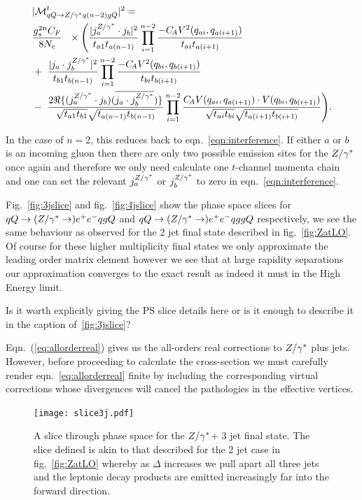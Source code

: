 		\begin{align}
		\begin{split}
		    &|\mathcal{M}^{t}_{qQ\to Z/\gamma^* q(n-2)gQ}|^2 = \\&\frac{g_s^{2n}C_F}{8N_c}\
		    \ \times \Bigg( \frac{| j_a^{Z/\gamma^*}\cdot j_b|^2}{t_{a1}t_{a(n-1)}} \prod^{n-2}_{i=1} \frac{-C_{\!A} V^2(q_{ai},
		      q_{a(i+1)})}{t_{ai} t_{a(i+1)}}  \\ & + \ \frac{|j_a \cdot j_b^{Z/\gamma^*} |^2}{t_{b1}t_{b(n-1)}}
		    \prod^{n-2}_{i=1}\frac{-C_{\!A} V^2(q_{bi}, q_{b(i+1)})}{t_{bi} t_{b(i+1)}}  \\
		    &-\ \frac{2\Re\{(j_a^{Z/\gamma^*}\cdot j_b)(\overline{j_a \cdot
		        j_b^{Z/\gamma^*}})\}}{\sqrt{t_{a1}t_{b1}}\sqrt{t_{a(n-1)} t_{b(n-1)}}}
		    \prod^{n-2}_{i=1}\frac{C_{\!A} V(q_{ai}, q_{a(i+1)})\cdot V(q_{bi},
		      q_{b(i+1)})}{\sqrt{t_{ai}t_{bi}} \sqrt{t_{a(i+1)}t_{b(i+1)}}}\Bigg).
			\label{eq:allorderreal}
		\end{split}
		\end{align}

		In the case of $n=2$, this reduces back to eqn.~\eqref{eqn:interference}.  If
		either $a$ or $b$ is an incoming gluon then there are only two possible emission sites
		for the $Z/\gamma^*$ once again and therefore we only need calculate one $t$-channel momenta chain
		and one can set the relevant $j_a^{Z/\gamma^*}$ or $j_b^{Z/\gamma^*}$ to
		zero in eqn.~\eqref{eqn:interference}.

		Fig.~\eqref{fig:3jslice} and fig.~\eqref{fig:4jslice} show the phase space
		slices for $qQ\to(Z/\gamma^*\to)e^+e^-qgQ$ and $qQ\to(Z/\gamma^*\to)e^+e^-qggQ$
		respectively, we see the same behaviour as observed for the 2 jet final state described in
		fig.~\eqref{fig:ZatLO}.  Of course for these higher multiplicity final states we only
		approximate the leading order matrix element however we see that at large rapidity separations
		our approximation converges to the exact result as indeed it must in the High Energy limit.

		{\color{red}Is it worth explicitly giving the PS slice details here or is it enough
		to describe it in the caption of~\eqref{fig:3jslice}?}

		Eqn.~(\eqref{eq:allorderreal}) gives us the all-orders real corrections to $Z/\gamma^*$ plus jets.
		However, before proceeding to calculate the cross-section we must carefully render eqn.~\eqref{eq:allorderreal}
		finite by including the corresponding virtual corrections whose divergences will cancel the pathologies
		in the effective vertices.

		\begin{figure}[hbt]
		  \begin{center}
		    \texttt{[image: slice3j.pdf]}
		    \caption{A slice through phase space for the $Z/\gamma^*$+ 3 jet final state.  The slice defined is
		    akin to that described for the 2 jet case in fig.~\eqref{fig:ZatLO} whereby as $\Delta$ increases
		    we pull apart all three jets and the leptonic decay products are emitted increasingly far into
		    the forward direction.}
		    \label{fig:3jslice}
		  \end{center}
		\end{figure}

